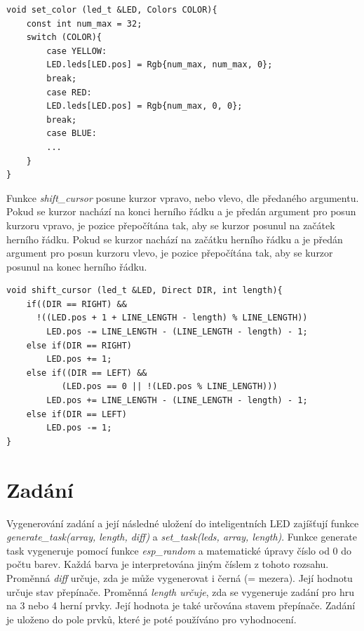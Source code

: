 \begin{minipage}{\linewidth}
\begin{lstlisting}[frame=single,numbers=right,caption={Ukázka funkce nastavující barvu inteligentním LED.},label=lst:priklad.vypis.kodu.C,basicstyle=\ttfamily\small, keywordstyle=\color{black}\bfseries\underbar,]
void set_color (led_t &LED, Colors COLOR){
    const int num_max = 32;
    switch (COLOR){
        case YELLOW:
        LED.leds[LED.pos] = Rgb{num_max, num_max, 0}; 
        break;
        case RED:
        LED.leds[LED.pos] = Rgb{num_max, 0, 0}; 
        break;
        case BLUE:
        ...
    } 
}    
\end{lstlisting}
\end{minipage} 

Funkce {\it shift\_cursor} posune kurzor vpravo, nebo vlevo, dle předaného argumentu. Pokud se kurzor nachází na konci herního řádku a je předán 
argument pro posun kurzoru vpravo, je pozice přepočítána tak, aby se kurzor posunul na začátek herního řádku. Pokud se kurzor nachází na začátku herního 
řádku a je předán argument pro posun kurzoru vlevo, je pozice přepočítána tak, aby se kurzor posunul na konec herního řádku. 

\begin{minipage}{\linewidth}
\begin{lstlisting}[frame=single,numbers=right,caption={Funkce posouvající kurzor.},label=lst:priklad.vypis.kodu.C,basicstyle=\ttfamily\small, keywordstyle=\color{black}\bfseries\underbar,]
void shift_cursor (led_t &LED, Direct DIR, int length){
    if((DIR == RIGHT) && 
      !((LED.pos + 1 + LINE_LENGTH - length) % LINE_LENGTH))
        LED.pos -= LINE_LENGTH - (LINE_LENGTH - length) - 1;
    else if(DIR == RIGHT)
        LED.pos += 1;
    else if((DIR == LEFT) && 
           (LED.pos == 0 || !(LED.pos % LINE_LENGTH)))
        LED.pos += LINE_LENGTH - (LINE_LENGTH - length) - 1;
    else if(DIR == LEFT)
        LED.pos -= 1;
}   
\end{lstlisting}
\end{minipage} 

\section{Zadání}
Vygenerování zadání a její následné uložení do inteligentních LED zajíšťují funkce {\it generate\_task(array, length, diff)} a {\it set\_task(leds, array, length)}.
Funkce generate task vygeneruje pomocí funkce {\it esp\_random} a matematické úpravy číslo od 0 do počtu barev. Každá barva je interpretována jiným číslem z tohoto 
rozsahu. Proměnná {\it diff} určuje, zda je může vygenerovat i černá (= mezera). Její hodnotu určuje stav přepínače. Proměnná {\it length určuje}, zda se vygeneruje zadání 
pro hru na 3 nebo 4 herní prvky. Její hodnota je také určována stavem přepínače. Zadání je uloženo do pole prvků, které je poté používáno pro vyhodnocení.

